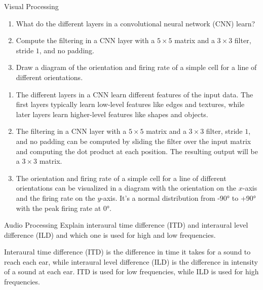\documentclass{article}
\begin{document}
\begin{exercise}{Visual Processing}
  \begin{enumerate}
    \item What do the different layers in a convolutional neural network (CNN) learn?
    \item Compute the filtering in a CNN layer with a $5 \times 5$ matrix and a $3 \times 3$ filter, stride $1$, and no padding.
    \item Draw a diagram of the orientation and firing rate of a simple cell for a line of different orientations.
  \end{enumerate}

  \begin{solution}
    \begin{enumerate}
      \item The different layers in a CNN learn different features of the input data. The first layers typically learn low-level features like edges and textures, while later layers learn higher-level features like shapes and objects.
      \item The filtering in a CNN layer with a $5 \times 5$ matrix and a $3 \times 3$ filter, stride $1$, and no padding can be computed by sliding the filter over the input matrix and computing the dot product at each position. The resulting output will be a $3 \times 3$ matrix.
      \item The orientation and firing rate of a simple cell for a line of different orientations can be visualized in a diagram with the orientation on the $x$-axis and the firing rate on the $y$-axis. It's a normal distribution from -90° to +90° with the peak firing rate at 0°.
    \end{enumerate}
  \end{solution}
\end{exercise}

\begin{exercise}{Audio Processing}
  Explain interaural time difference (ITD) and interaural level difference (ILD) and which one is used for high and low frequencies.

  \begin{solution}
    Interaural time difference (ITD) is the difference in time it takes for a sound to reach each ear, while interaural level difference (ILD) is the difference in intensity of a sound at each ear. ITD is used for low frequencies, while ILD is used for high frequencies.
  \end{solution}
\end{exercise}
\end{document}
